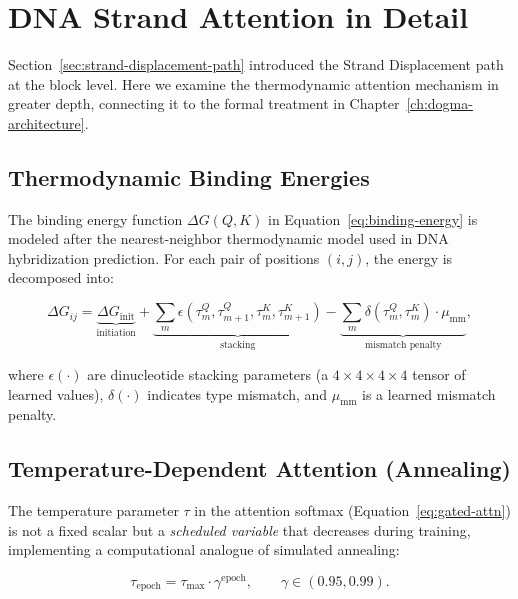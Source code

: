 \section{DNA Strand Attention in Detail}
\label{sec:dna-strand-attention}

Section~\ref{sec:strand-displacement-path} introduced the Strand Displacement path at the block level. Here we examine the thermodynamic attention mechanism in greater depth, connecting it to the formal treatment in Chapter~\ref{ch:dogma-architecture}.

\subsection{Thermodynamic Binding Energies}

The binding energy function $\Delta G(Q, K)$ in Equation~\ref{eq:binding-energy} is modeled after the nearest-neighbor thermodynamic model used in DNA hybridization prediction. For each pair of positions $(i, j)$, the energy is decomposed into:

\begin{equation}
\Delta G_{ij} = \underbrace{\Delta G_{\mathrm{init}}}_{\text{initiation}} + \underbrace{\sum_{m} \epsilon(\tau_m^Q, \tau_{m+1}^Q, \tau_m^K, \tau_{m+1}^K)}_{\text{stacking}} - \underbrace{\sum_{m} \delta(\tau_m^Q, \tau_m^K) \cdot \mu_{\mathrm{mm}}}_{\text{mismatch penalty}},
\label{eq:dg-decomposition}
\end{equation}

where $\epsilon(\cdot)$ are dinucleotide stacking parameters (a $4 \times 4 \times 4 \times 4$ tensor of learned values), $\delta(\cdot)$ indicates type mismatch, and $\mu_{\mathrm{mm}}$ is a learned mismatch penalty.

\subsection{Temperature-Dependent Attention (Annealing)}

The temperature parameter $\tau$ in the attention softmax (Equation~\ref{eq:gated-attn}) is not a fixed scalar but a \emph{scheduled variable} that decreases during training, implementing a computational analogue of simulated annealing:

\begin{equation}
\tau_{\mathrm{epoch}} = \tau_{\max} \cdot \gamma^{\mathrm{epoch}}, \qquad \gamma \in (0.95, 0.99).
\label{eq:annealing-schedule}
\end{equation}

